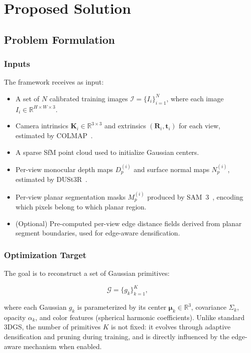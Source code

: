\chapter{Proposed Solution}

\section{Problem Formulation}

\subsection{Inputs}

The framework receives as input:
\begin{itemize}
    \item A set of $N$ calibrated training images $\mathcal{I} = \{I_i\}_{i=1}^N$, where each image $I_i \in \mathbb{R}^{H \times W \times 3}$.
    \item Camera intrinsics $\mathbf{K}_i \in \mathbb{R}^{3\times3}$ and extrinsics $(\mathbf{R}_i, \mathbf{t}_i)$ for each view, estimated by COLMAP~\cite{schoenberger2016sfm}.
    \item A sparse SfM point cloud used to initialize Gaussian centers.
    \item Per-view monocular depth maps $D_p^{(i)}$ and surface normal maps $N_p^{(i)}$, estimated by DUSt3R~\cite{dust3r}.
    \item Per-view planar segmentation masks $M_p^{(i)}$ produced by SAM~3~\cite{sam3}, encoding which pixels belong to which planar region.
    \item (Optional) Pre-computed per-view edge distance fields derived from planar segment boundaries, used for edge-aware densification.
\end{itemize}

\subsection{Optimization Target}

The goal is to reconstruct a set of Gaussian primitives:

\begin{equation}
\mathcal{G} = \{ g_k \}_{k=1}^K,
\end{equation}

where each Gaussian $g_k$ is parameterized by its center $\boldsymbol{\mu}_k \in \mathbb{R}^3$, covariance $\Sigma_k$, opacity $\alpha_k$, and color features (spherical harmonic coefficients). Unlike standard 3DGS, the number of primitives $K$ is not fixed: it evolves through adaptive densification and pruning during training, and is directly influenced by the edge-aware mechanism when enabled.

